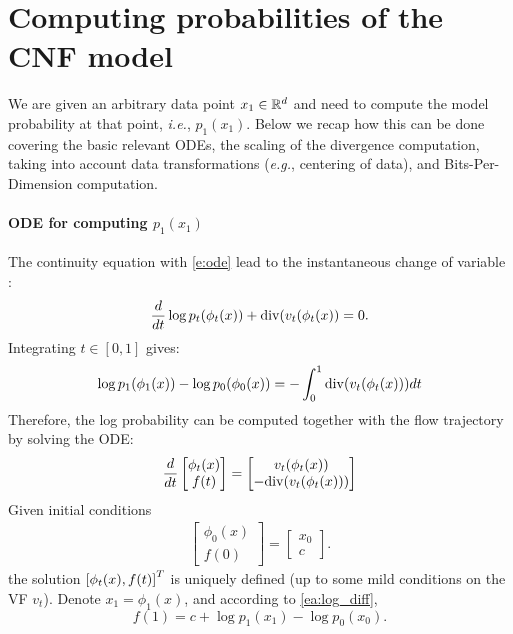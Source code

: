 \documentclass{article}
\makeatletter
\renewcommand*{\eg}{{\it e.g.}\@\xspace}
\renewcommand*{\ie}{{\it i.e.}\@\xspace}
\makeatother
\begin{document}
\section{Computing probabilities of the CNF model}
\label{A:cnf_prob}

We are given an arbitrary data point $x_1\in \mathbb R^d$ and need to compute the model probability at that point, \ie, $p_1(x_1)$. Below we recap how this can be done covering the basic relevant ODEs, the scaling of the divergence computation, taking into account data transformations (\eg, centering of data), and Bits-Per-Dimension computation. 

\paragraph{ODE for computing $p_1(x_1)$}
The continuity equation with \eqref{e:ode} lead to the instantaneous change of variable  \citep{chen2018neural,ben2022matching}:
\begin{align*}
    \frac{d}{dt}\log p_t(\phi_t(x)) + \mathrm{div} (v_t(\phi_t(x))=0.
\end{align*}
Integrating $t\in [0,1]$ gives:
\begin{align}\label{ea:log_diff}
    \log p_1(\phi_1(x)) - \log p_0(\phi_0(x)) = -\int_0^1 \mathrm{div}(v_t(\phi_t(x))) dt
\end{align}
Therefore, the log probability can be computed together with the flow trajectory by solving the ODE:
\begin{align}\label{ea:system}
    \frac{d}{dt}\begin{bmatrix}
    \phi_t(x) \\
    f(t) 
    \end{bmatrix}=
    \begin{bmatrix}
    v_t(\phi_t(x)) \\ 
    -\mathrm{div} (v_t(\phi_t(x)))
    \end{bmatrix}
\end{align}
Given initial conditions 
\begin{align}\label{ea:initial_conds}
    \begin{bmatrix}
    \phi_0(x) \\ 
    f(0)
    \end{bmatrix} = \begin{bmatrix}
    x_0 \\ c
    \end{bmatrix}.
\end{align}
the solution $\left [\phi_t(x),f(t)\right ]^T$ is uniquely defined (up to some mild conditions on the VF $v_t$). Denote $x_1 = \phi_1(x)$, and according to \eqref{ea:log_diff}, 
\begin{equation}\label{ea:f1}
    f(1) = c + \log p_1(x_1) - \log p_0(x_0).
\end{equation}
\end{document}
